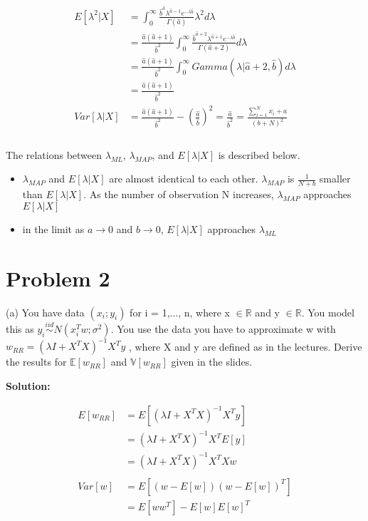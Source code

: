 \documentclass[11pt]{report}
\begin{document}
\begin{equation*}
\begin{split}
E[\lambda^2|X] &= \int^{\infty}_0\frac{ \hat{b}^{\hat{a} } \lambda^{\hat{a} - 1} e^{-\lambda\hat{b}}}{\Gamma(\hat{a})} \lambda^2 d\lambda \\
&= \frac{\hat{a} (\hat{a} + 1)}{\hat{b}^2} \int^{\infty}_0 \frac{\hat{b}^{\hat{a} + 2} \lambda^{\hat{a} + 1} e^{-\lambda \hat{b}} }{\Gamma{(\hat{a} + 2)}} d\lambda \\
&= \frac{\hat{a} (\hat{a} + 1)}{\hat{b}^2} \int^{\infty}_0 Gamma(\lambda|\hat{a} + 2, \hat{b}) d\lambda \\
&= \frac{\hat{a} (\hat{a} + 1)}{\hat{b}^2} \\
Var[\lambda|X] &= \frac{\hat{a} (\hat{a} + 1)}{\hat{b}^2}  - (\frac{\hat{a}}{\hat{b}})^2 = \frac{\hat{a}}{\hat{b}^2} = \frac{\sum_{i=1}^Nx_i + a}{(b+ N)^2} \\
\end{split} 
\end{equation*}
\\
The relations between $\lambda_{ML}$, $\lambda_{MAP}$, and $E[\lambda|X]$ is described below. 
\begin{itemize}
\item $\lambda_{MAP}$ and $E[\lambda|X]$ are almost identical to each other. $\lambda_{MAP}$ is $\frac{1}{N + b}$ smaller than $E[\lambda|X]$. As the number of observation N increases, $\lambda_{MAP}$ approaches $E[\lambda|X]$
\item in the limit as $a \xrightarrow{} 0$ and $b \xrightarrow{} 0$, $E[\lambda|X]$ approaches $\lambda_{ML}$
\end{itemize}

\section{Problem 2}
\justify
(a) You have data $(x_i; y_i)$ for i = 1,..., n, where x $\in  \mathbb{R}$ and y $\in \mathbb{R}$. You model this as $y_i \stackrel{iid}{\sim} N(x_i^Tw; \sigma^2)$. You use the data you have to approximate w with $w_{RR}= (\lambda I + X^TX)^{-1}X^T y$ , where X
and y are defined as in the lectures. Derive the results for $\mathbb{E}[w_{RR}]$ and $\mathbb{V}[w_{RR}]$ given in the slides.

\justify
\textbf{Solution:}

\begin{equation*}
\begin{split}
E[w_{RR}] &=  E[(\lambda I + X^TX)^{-1}X^T y] \\
&= (\lambda I + X^TX)^{-1}X^T E[y] \\
&= (\lambda I + X^TX)^{-1}X^TXw \\
\\
Var[w] &=  E[(w - E[w])(w - E[w])^T] \\
&=  E[w w^T] - E[w]E[w]^T \\
\end{split} 
\end{equation*}
\end{document}

